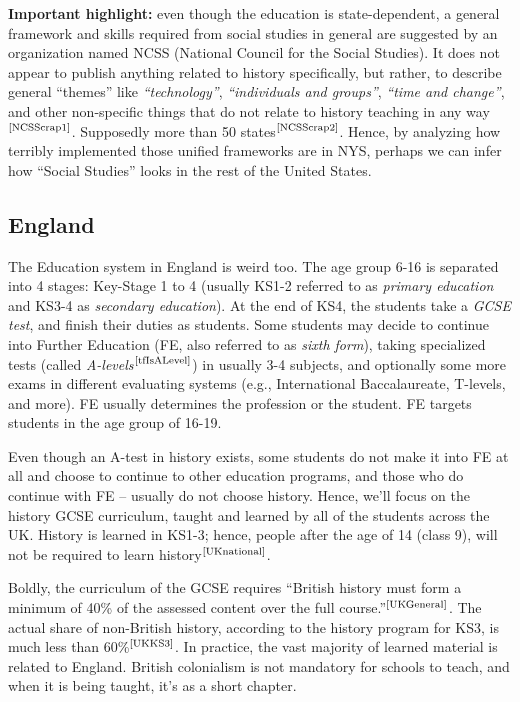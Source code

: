 \documentclass[12pt]{article}
\newcommand\mc[1]  {$^{\text{\cite{#1}}}$}
\begin{document}
	\textbf{Important highlight: }even though the education is state-dependent, a general framework and skills required from social studies in general are suggested by an organization named NCSS (National Council for the Social Studies). It does not appear to publish anything related to history specifically, but rather, to describe general ``themes'' like \textit{``technology''}, \textit{``individuals and groups''}, \textit{``time and change''}, and other non-specific things that do not relate to history teaching in any way\mc{NCSScrap1}. Supposedly more than 50 states\mc{NCSScrap2}. Hence, by analyzing how terribly implemented those unified frameworks are in NYS, perhaps we can infer how ``Social Studies'' looks in the rest of the United States. 
	
	\subsection{England}
	The Education system in England is weird too. The age group 6-16 is separated into 4 stages: Key-Stage 1 to 4 (usually KS1-2 referred to as \textit{primary education} and KS3-4 as \textit{secondary education}). At the end of KS4, the students take a \textit{GCSE test}, and finish their duties as students. Some students may decide to continue into Further Education (FE, also referred to as \textit{sixth form}), taking specialized tests (called \textit{A-levels}\mc{tfIsALevel}) in usually 3-4 subjects, and optionally some more exams in different evaluating systems (e.g., International Baccalaureate, T-levels, and more). FE usually determines the profession or the student. FE targets students in the age group of 16-19. 
	
	Even though an A-test in history exists, some students do not make it into FE at all and choose to continue to other education programs, and those who do continue with FE -- usually do not choose history. Hence, we'll focus on the history GCSE curriculum, taught and learned by all of the students across the UK. History is learned in KS1-3; hence, people after the age of 14 (class 9), will not be required to learn history\mc{UKnational}. 
	
	Boldly, the curriculum of the GCSE requires ``British history must form a minimum of 40\% of the assessed content over the full course.''\mc{UKGeneral}. The actual share of non-British history, according to the history program for KS3, is much less than 60\%\mc{UKKS3}. In practice, the vast majority of learned material is related to England. British colonialism is not mandatory for schools to teach, and when it is being taught, it's as a short chapter. 
	
\end{document}
